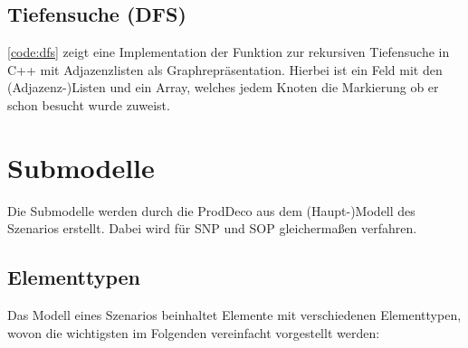 \subsection{Tiefensuche (DFS)}

\autoref{code:dfs} zeigt eine Implementation der Funktion zur rekursiven Tiefensuche in C++ mit Adjazenzlisten als Graphrepräsentation. Hierbei ist  ein Feld mit den (Adjazenz-)Listen und  ein Array, welches jedem Knoten die Markierung ob er schon besucht wurde zuweist.




\section{Submodelle} \label{sec:submodelle}

Die Submodelle werden durch die \ac{ProdDeco} aus dem (Haupt-)Modell des Szenarios erstellt. Dabei wird für \ac{SNP} und \ac{SOP} gleichermaßen verfahren. 

\subsection{Elementtypen} \label{sec:elements}
Das Modell eines Szenarios beinhaltet Elemente mit verschiedenen Elementtypen, wovon die wichtigsten im Folgenden vereinfacht vorgestellt werden:

